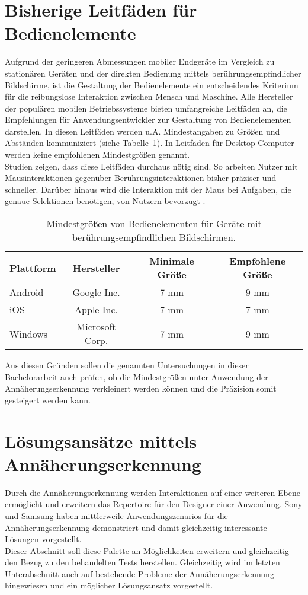 \documentclass[12pt,numbers=noenddot,parskip,bibliography=totocnumbered,listof=totocnumbered]{scrreprt}
\begin{document}
\section{Bisherige Leitfäden für Bedienelemente}
Aufgrund der geringeren Abmessungen mobiler Endgeräte im Vergleich zu stationären Geräten und der direkten Bedienung mittels berührungsempfindlicher Bildschirme, ist die Gestaltung der Bedienelemente ein entscheidendes Kriterium für die reibungslose Interaktion zwischen Mensch und Maschine. Alle Hersteller der populären mobilen Betriebssysteme bieten umfangreiche Leitfäden an, die Empfehlungen für Anwendungsentwickler zur Gestaltung von Bedienelementen darstellen. In diesen Leitfäden werden u.A. Mindestangaben zu Größen und Abständen kommuniziert (siehe Tabelle~\ref{leitfadenalle}). In Leitfäden für Desktop-Computer werden keine empfohlenen Mindestgrößen genannt.\\
Studien zeigen, dass diese Leitfäden durchaus nötig sind. So arbeiten Nutzer mit Mausinteraktionen gegenüber Berührungsinteraktionen bisher präziser und schneller. Darüber hinaus wird die Interaktion mit der Maus bei Aufgaben, die genaue Selektionen benötigen, von Nutzern bevorzugt \citep{touchmouse}.
\begin{table}
\centering
\renewcommand{\arraystretch}{2}
\setlength{\tabcolsep}{12pt}
\begin{tabular}{ l c c c }
Plattform & Hersteller & Minimale Größe & Empfohlene Größe\\\hline
Android \citep{androidrichtlinien} & Google Inc. & $7$ mm & $9$ mm\\
iOS \citep{applerichtlinien} & Apple Inc. & $7$ mm & $7$ mm\\
Windows \citep{winrichtlinien} & Microsoft Corp. & $7$ mm & $9$ mm\\
\end{tabular}
\caption{Mindestgrößen von Bedienelementen für Geräte mit berührungsempfindlichen Bildschirmen.}
\label{leitfadenalle}
\end{table}
Aus diesen Gründen sollen die genannten Untersuchungen in dieser Bachelorarbeit auch prüfen, ob die Mindestgrößen unter Anwendung der Annäherungserkennung verkleinert werden können und die Präzision somit gesteigert werden kann.

\section{Lösungsansätze mittels Annäherungserkennung}
Durch die Annäherungserkennung werden Interaktionen auf einer weiteren Ebene ermöglicht und erweitern das Repertoire für den Designer einer Anwendung. Sony und Samsung haben mittlerweile Anwendungszenarios für die Annäherungserkennung demonstriert und damit gleichzeitig interessante Lösungen vorgestellt.\\
Dieser Abschnitt soll diese Palette an Möglichkeiten erweitern und gleichzeitig den Bezug zu den behandelten Tests herstellen. Gleichzeitig wird im letzten Unterabschnitt auch auf bestehende Probleme der Annäherungserkennung hingewiesen und ein möglicher Lösungsansatz vorgestellt.
\end{document}
